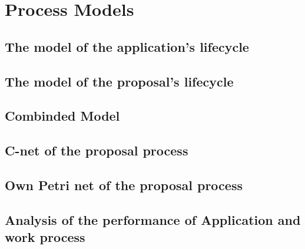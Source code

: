 \section*{Process Models}
\subsection*{The model of the application's lifecycle}

\subsection*{The model of the proposal's lifecycle }

\subsection*{Combinded Model}

\subsection*{C-net of the proposal process}

\subsection*{Own Petri net of the proposal process}

\subsection*{Analysis of the performance of Application and work process}
